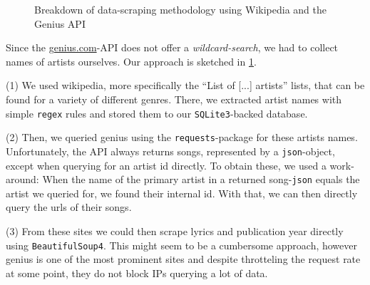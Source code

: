 \documentclass[11pt,a4paper]{article}
\begin{document}
\begin{figure}[t!]
\begin{adjustbox}{width=0.5\textwidth}
\end{adjustbox}
    \caption{Breakdown of data-scraping methodology using Wikipedia and the Genius API}	
    \label{fig:scrape}
\end{figure}

Since the \url{genius.com}-API does not offer a \emph{wildcard-search}, we had to collect names of artists ourselves. Our approach is sketched in \cref{fig:scrape}. 

(1) We used wikipedia, more specifically the \enquote{List of [...] artists} lists, that can be found for a variety of different genres. There, we extracted artist names with simple \texttt{regex} rules and stored them to our \texttt{SQLite3}-backed database. 

(2) Then, we queried genius using the \texttt{requests}-package for these artists names. 
Unfortunately, the API always returns songs, represented by a \texttt{json}-object, except when querying for an artist id directly. To obtain these, we used a work-around: When the name of the primary artist in a returned song-\texttt{json} equals the artist we queried for, we found their internal id. With that, we can then directly query the urls of their songs. 

(3) From these sites we could then scrape lyrics and publication year directly using \texttt{BeautifulSoup4}. This might seem to be a cumbersome approach, however genius is one of the most prominent sites and despite throtteling the request rate at some point, they do not block IPs querying a lot of data. %
\end{document}
